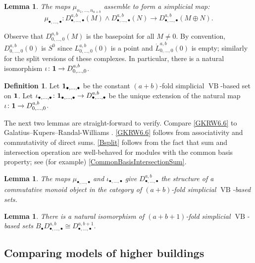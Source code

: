 \documentclass[a4paper]{amsart}
\DeclareMathOperator{\VB}{VB}
\newcommand{\m}{\to}
\numberwithin{theoremcounter}{section}
\newtheorem{lemma}[lemmaauto]{Lemma}
\theoremstyle{definition}
\newtheorem{definition}[Defauto]{Definition}
\theoremstyle{remark}
\begin{document}
\begin{lemma}
The maps $\mu_{n_1,\dots,n_{a+b}} $ assemble to form a simplicial map:  $$\mu_{\bullet,\dots,\bullet}\colon  D^{a,b}_{\bullet,\dots,\bullet}(M) \wedge D^{a,b}_{\bullet,\dots,\bullet}(N) \m D^{a,b}_{\bullet,\dots,\bullet}(M \oplus N).$$
\end{lemma}





Observe that $D^{a,b}_{0,\dots,0}(M)$ is  the basepoint for all $M\neq 0$. By convention, $D^{a,b}_{0,\dots,0}(0)$ is $S^0$ since $L^{a,b}_{0,\dots,0}(0)$ is a point and $\mathring{L}^{a,b}_{0,\dots,0}(0)$ is empty; similarly for the split versions of these complexes.
In particular, there is a natural isomorphism $\iota \colon  {\bf 1} \m  D^{a,b}_{0,\dots,0}$. 

\begin{definition}
Let ${\bf 1}_{\bullet,\dots,\bullet} $ be the constant $(a+b)$-fold simplicial  $\VB$-based set on ${\bf 1}$.  Let $\iota_{\bullet,\dots,\bullet} \colon {\bf 1}_{\bullet,\dots,\bullet}  \m  D^{a,b}_{\bullet,\dots,\bullet}$ be the unique extension of the natural map $\iota \colon  {\bf 1} \m  D^{a,b}_{0,\dots,0}$. 
\end{definition}

 The next two lemmas are straight-forward to verify. Compare \autoref{GKRW6.6} to Galatius--Kupers--Randal-Williams \cite[Lemma 6.6]{e2cellsIV}. \autoref{GKRW6.6} follows from associativity and commutativity of direct sums. \autoref{Bsplit} follows from the fact that sum and intersection operation are well-behaved for modules with the common basis property; see (for example) \autoref{CommonBasisIntersectionSum}. 

\begin{lemma} \label{GKRW6.6}
The maps $\mu_{\bullet,\dots,\bullet}$ and $\iota_{\bullet,\dots,\bullet} $ give $D^{a,b}_{\bullet,\dots,\bullet}$ the structure of a commutative monoid object in the category of $(a+b)$-fold simplicial $\VB$-based sets.
\end{lemma}

\begin{lemma} \label{Bsplit}
There is a natural isomorphism of $(a+b+1)$-fold simplicial $\VB$-based sets $B_\bullet D^{a,b}_{\bullet,\dots,\bullet} \cong D^{a,b+1}_{\bullet,\dots,\bullet}$.
\end{lemma}





\subsection{Comparing models of higher buildings}
\end{document}
